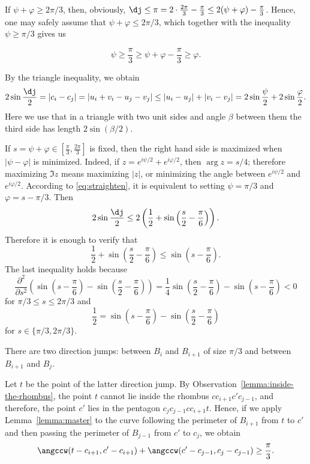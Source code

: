 \begin{enumerate}[label={\bf Case \arabic*: }, wide, labelwidth=!, labelindent=0pt]
If $\psi + \varphi\geq 2\pi/3$, then, obviously, $\dj\leq \pi = 2\cdot\frac{2\pi}{3} - \frac{\pi}{3}\leq 2(\psi + \varphi) - \frac{\pi}{3}$. Hence, one may safely assume that $\psi + \varphi\leq 2\pi/3$, which together with the inequality $\psi\geq\pi/3$ gives us

\begin{equation}
\label{eq:straighten}
\psi \geq \frac{\pi}{3}\geq \psi + \varphi - \frac{\pi}{3}\geq \varphi.
\end{equation}

By the triangle inequality, we obtain
$$2\sin\frac{\dj}{2} = |c_i - c_j| = |u_i + v_i - u_j - v_j|\leq |u_i - u_j| + |v_i - v_j| = 2\sin\frac{\psi}{2} + 2\sin\frac{\varphi}{2}.$$ Here we use that in a triangle with two unit sides and angle $\beta$ between them the third side has length $2\sin(\beta/2)$.

If $s = \psi + \varphi\in\left[\frac{\pi}{3}, \frac{2\pi}{3}\right]$ is fixed, then the right hand side is maximized when $|\psi - \varphi|$ is minimized. Indeed, if $z = e^{i\psi/2} + e^{i\varphi/2}$, then $\arg{z} = s/4$; therefore maximizing $\Im{z}$ means maximizing $|z|$, or minimizing the angle between $e^{i\psi/2}$ and $e^{i\varphi/2}$. According to \eqref{eq:straighten}, it is equivalent to setting $\psi=\pi/3$ and $\varphi = s - \pi/3$. Then $$2\sin\frac{\dj}{2}\leq 2\left(\frac{1}{2} + \sin\left(\frac{s}{2} - \frac{\pi}{6}\right)\right).$$ Therefore it is enough to verify that $$\frac{1}{2} + \sin\left(\frac{s}{2} - \frac{\pi}{6}\right)\leq\sin\left(s - \frac{\pi}{6}\right).$$
The last inequality holds because $$\frac{\partial^2}{\partial s^2}\left(\sin\left(s - \frac{\pi}{6}\right) - \sin\left(\frac{s}{2} - \frac{\pi}{6}\right)\right) = \frac{1}{4}\sin\left(\frac{s}{2} - \frac{\pi}{6}\right) - \sin\left(s - \frac{\pi}{6}\right) < 0$$
for $\pi/3\leq s\leq 2\pi/3$ and
$$\frac{1}{2} = \sin\left(s - \frac{\pi}{6}\right) - \sin\left(\frac{s}{2} - \frac{\pi}{6}\right)$$
for $s\in\{\pi/3, 2\pi/3\}$.


There are two direction jumps: between $B_i$ and $B_{i+1}$ of size $\pi/3$ and between $B_{i+1}$ and $B_j$.

Let $t$ be the point of the latter direction jump.
By Observation~\ref{lemma:inside-the-rhombus}, the point $t$ cannot lie inside the rhombus $cc_{i+1}c'c_{j-1}$, and therefore, the point $c'$ lies in the pentagon $c_{j}c_{j-1}cc_{i+1}t$.
Hence, if we apply Lemma~\ref{lemma:master} to the curve following the perimeter of $B_{i+1}$ from $t$ to $c'$ and then passing the perimeter of $B_{j-1}$ from $c'$ to $c_j$, we obtain
\begin{equation}
\angccw(t - c_{i+1}, c' - c_{i+1}) + \angccw(c' - c_{j-1}, c_j - c_{j-1})\geq\frac{\pi}{3}. \label{eqn:with-t}
\end{equation}


\end{enumerate}
